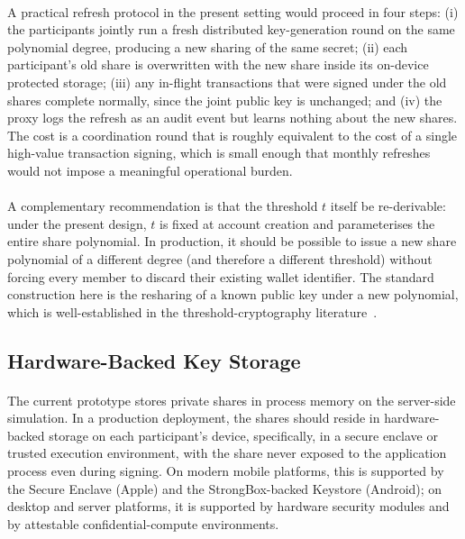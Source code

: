 \paragraph{}A practical refresh protocol in the present setting would proceed in four steps: (i) the participants jointly run a fresh distributed key-generation round on the same polynomial degree, producing a new sharing of the same secret; (ii) each participant's old share is overwritten with the new share inside its on-device protected storage; (iii) any in-flight transactions that were signed under the old shares complete normally, since the joint public key is unchanged; and (iv) the proxy logs the refresh as an audit event but learns nothing about the new shares. The cost is a coordination round that is roughly equivalent to the cost of a single high-value transaction signing, which is small enough that monthly refreshes would not impose a meaningful operational burden.

\paragraph{}A complementary recommendation is that the threshold $t$ itself be re-derivable: under the present design, $t$ is fixed at account creation and parameterises the entire share polynomial. In production, it should be possible to issue a new share polynomial of a different degree (and therefore a different threshold) without forcing every member to discard their existing wallet identifier. The standard construction here is the resharing of a known public key under a new polynomial, which is well-established in the threshold-cryptography literature~\cite{gennaro2007, komlo2021}.

\subsection{Hardware-Backed Key Storage}
\label{sect:rec_hardware}

\paragraph{}The current prototype stores private shares in process memory on the server-side simulation. In a production deployment, the shares should reside in hardware-backed storage on each participant's device, specifically, in a secure enclave or trusted execution environment, with the share never exposed to the application process even during signing. On modern mobile platforms, this is supported by the Secure Enclave (Apple) and the StrongBox-backed Keystore (Android); on desktop and server platforms, it is supported by hardware security modules and by attestable confidential-compute environments.

